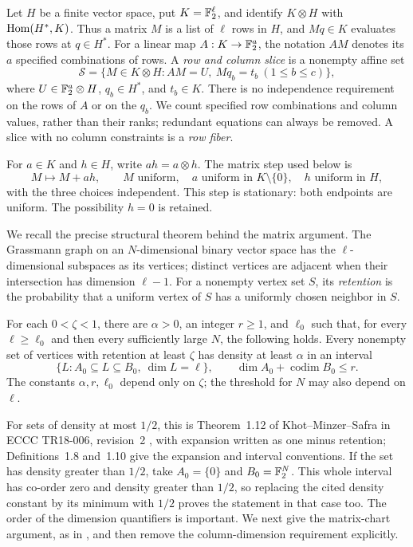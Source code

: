 Let $H$ be a finite vector space, put $K=\mathbb F_2^\ell$, and identify
$K\otimes H$ with $\operatorname{Hom}(H^*,K)$.  Thus a matrix $M$ is a list of
$\ell$ rows in $H$, and $Mq\in K$ evaluates those rows at
$q\in H^*$.  For a linear map $A:K\to\mathbb F_2^a$, the notation $AM$
denotes its $a$ specified combinations of rows.  A \emph{row and
column slice} is a nonempty affine set
\begin{equation}
 \mathcal S=
 \{M\in K\otimes H: AM=U,\ Mq_b=t_b\ (1\leq b\leq c)\},
 \label{eq:prelim-slice}
\end{equation}
where $U\in\mathbb F_2^a\otimes H$, $q_b\in H^*$, and $t_b\in K$.
There is no independence requirement on the rows of $A$ or on the
$q_b$.  We count specified row combinations and column values, rather
than their ranks; redundant equations can always be removed.  A slice
with no column constraints is a \emph{row fiber}.

For $a\in K$ and $h\in H$, write $ah=a\otimes h$.
The matrix step used below is
\[
 M\longmapsto M+ah,
 \qquad M\text{ uniform},\quad
 a\text{ uniform in }K\setminus\{0\},\quad h\text{ uniform in }H,
\]
with the three choices independent.  This step is stationary: both
endpoints are uniform.  The possibility $h=0$ is retained.

We recall the precise structural theorem behind the matrix argument.
The Grassmann graph on an $N$-dimensional binary vector space has
the $\ell$-dimensional subspaces as its vertices; distinct vertices
are adjacent when their intersection has dimension $\ell-1$.
For a nonempty vertex set $S$, its \emph{retention} is the probability
that a uniform vertex of $S$ has a uniformly chosen neighbor in $S$.

\begin{theorem}
\label{thm:prelim-grassmann}
For each $0<\zeta<1$, there are $\alpha>0$, an integer $r\geq1$,
and $\ell_0$ such that, for every $\ell\geq\ell_0$ and then every
sufficiently large $N$, the following holds.  Every nonempty set of vertices
with retention at least $\zeta$ has density at least $\alpha$ in an
interval
\[
 \{L:A_0\subseteq L\subseteq B_0,\ \dim L=\ell\},
 \qquad \dim A_0+\operatorname{codim}B_0\leq r.
\]
The constants $\alpha,r,\ell_0$ depend only on $\zeta$; the
threshold for $N$ may also depend on $\ell$.
\end{theorem}

For sets of density at most $1/2$, this is Theorem~1.12 of
Khot--Minzer--Safra in ECCC TR18-006, revision~2
\cite{KhotMinzerSafra2018}, with expansion written as one minus retention;
Definitions~1.8 and~1.10 give the expansion and interval conventions.
If the set has density greater than $1/2$, take $A_0=\{0\}$ and
$B_0=\mathbb F_2^N$.  This whole interval has co-order zero and density greater
than $1/2$, so replacing the cited density constant by its minimum with
$1/2$ proves the statement in that case too.
The order of the dimension quantifiers is important.  We
next give the matrix-chart argument, as in
\cite[Section~3]{BarakKothariSteurer2018}, and then remove the
column-dimension requirement explicitly.

